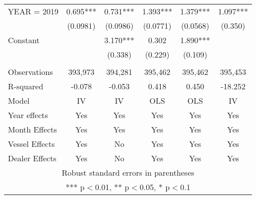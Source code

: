 \begin{tabular}{lccccc}
YEAR = 2019 & 0.695*** & 0.731*** & 1.393*** & 1.379*** & 1.097*** \\
 & (0.0981) & (0.0986) & (0.0771) & (0.0568) & (0.350) \\
Constant &  & 3.170*** & 0.302 & 1.890*** &  \\
 &  & (0.338) & (0.229) & (0.109) &  \\
 &  &  &  &  &  \\
Observations & 393,973 & 394,281 & 395,462 & 395,462 & 395,453 \\
R-squared & -0.078 & -0.053 & 0.418 & 0.450 & -18.252 \\
Model & IV & IV & OLS & OLS & IV \\
Year effects & Yes & Yes & Yes & Yes & Yes \\
Month Effects & Yes & Yes & Yes & Yes & Yes \\
Vessel Effects & Yes & No & Yes & Yes & Yes \\
 Dealer Effects & Yes & No & Yes & Yes & Yes \\ \hline
\multicolumn{6}{c}{ Robust standard errors in parentheses} \\
\multicolumn{6}{c}{ *** p$<$0.01, ** p$<$0.05, * p$<$0.1} \\
\end{tabular}
